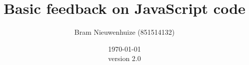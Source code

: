 \documentclass{article}
\begin{document}
 

\title{Basic feedback on JavaScript code} \author{Bram Nieuwenhuize (851514132)} 
\date{\today \\version 2.0} \maketitle 






\printglossaries
\end{document}
